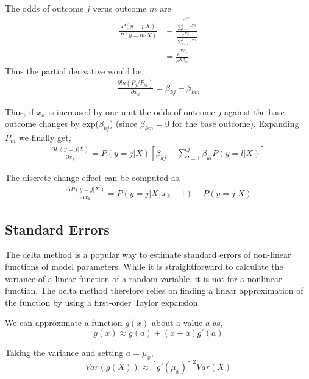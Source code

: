 The odds of outcome $j$ verus outcome $m$ are
\begin{align*}
  \frac{P(y=j | X)}{P(y=m | X)} & = \frac{\frac{e^{X\beta_j}}{\sum_{l=1}^{j} e^{X\beta_l}}}
                                       {\frac{e^{X\beta_m}}{\sum_{l=1}^{j} e^{X\beta_l}}} \\
                                & = \frac{e^{X\beta_j}}{e^{X\beta_m}}
\end{align*}
Thus the partial derivative would be,
\begin{gather*}
  \frac{\partial ln(P_j/P_m)}{\partial x_k} = \beta_{kj} - \beta_{km}
\end{gather*}

Thus, if $x_k$ is increased by one unit the odds of outcome $j$ against the
base outcome changes by exp($\beta_{kj}$) (since $\beta_{km}=0$ for the base
outcome). Expanding $P_m$ we finally get,
\begin{gather*}
  \frac{\partial P(y=j|X)}{\partial x_k} = P(y=j|X)\left[ \beta_{kj} - \sum_{l=1}^{j}\beta_{kl} P(y=l|X) \right]
\end{gather*}

The discrete change effect can be computed as,
\begin{gather*}
  \frac{\Delta P(y=j|X)}{\Delta x_k} = P(y=j|X, x_k+1) - P(y=j|X)
\end{gather*}

\subsection{Standard Errors} %
\label{sub:standard_errors}
The delta method is a popular way to estimate standard errors of non-linear
functions of model parameters. While it is straightforward to calculate the
variance of a linear function of a random variable, it is not for a nonlinear
function. The delta method therefore relies on finding a linear approximation
of the function by using a first-order Taylor expansion.

We can approximate a function $g(x)$ about a value $a$ as,
\[
g(x) \approx g(a) + (x-a)g'(a)
\]

Taking the variance and setting $a = \mu_x$,
\[
Var(g(X)) \approx \left[g'(\mu_x)\right]^2 Var(X)
\]

